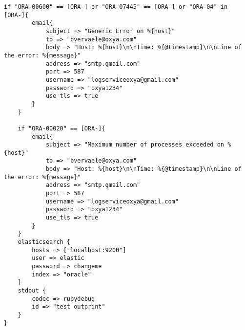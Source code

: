 \begin{lstlisting}[frame=single]
    if "ORA-00600" == [ORA-] or "ORA-07445" == [ORA-] or "ORA-04" in [ORA-]{
        email{
            subject => "Generic Error on %{host}"
            to => "bvervaele@oxya.com"
            body => "Host: %{host}\n\nTime: %{@timestamp}\n\nLine of the error: %{message}"
            address => "smtp.gmail.com"
            port => 587
            username => "logserviceoxya@gmail.com"
            password => "oxya1234"
            use_tls => true
        }
    }

    if "ORA-00020" == [ORA-]{
        email{
            subject => "Maximum number of processes exceeded on %{host}"
            to => "bvervaele@oxya.com"
            body => "Host: %{host}\n\nTime: %{@timestamp}\n\nLine of the error: %{message}"
            address => "smtp.gmail.com"
            port => 587
            username => "logserviceoxya@gmail.com"
            password => "oxya1234"
            use_tls => true
        }
    }
    elasticsearch {
        hosts => ["localhost:9200"]
        user => elastic
        password => changeme
        index => "oracle"
    }
    stdout { 
        codec => rubydebug
        id => "test outprint" 
    }
}
\end{lstlisting}

